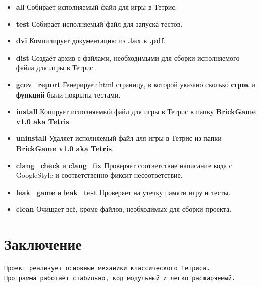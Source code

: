 \documentclass[a4paper, 12pt]{report}
\begin{document}
\begin{itemize}
    \item \textbf{all}
        Собирает исполняемый файл для игры в Тетрис.
    \item \textbf{test}
        Собирает исполняемый файл для запуска тестов.
    \item \textbf{dvi}
        Компилирует документацию из \textbf{.tex} в \textbf{.pdf}.
    \item \textbf{dist}
        Создаёт архив с файлами, необходимыми для сборки исполняемого файла для игры в Тетрис.
    \item \textbf{gcov\_report}
        Генерирует html страницу, в которой указано сколько \textbf{строк} и \textbf{функций} были покрыты тестами.
    \item \textbf{install}
        Копирует исполняемый файл для игры в Тетрис в папку \textbf{BrickGame v1.0 aka Tetris}.
    \item \textbf{uninstall}
        Удаляет исполняемый файл для игры в Тетрис из папки \textbf{BrickGame v1.0 aka Tetris}.
    \item \textbf{clang\_check} и \textbf{clang\_fix}
        Проверяет соответствие написание кода с GoogleStyle и соответственно фиксит несоответствие.
    \item \textbf{leak\_game} и \textbf{leak\_test}
        Проверяет на утечку памяти игру и тесты.
    \item \textbf{clean}
        Очищает всё, кроме файлов, необходимых для сборки проекта.
\end{itemize}

\clearpage
\chapter{Заключение}

\begin{verbatim}
Проект реализует основные механики классического Тетриса.
Программа работает стабильно, код модульный и легко расширяемый.
\end{verbatim}
\end{document}

